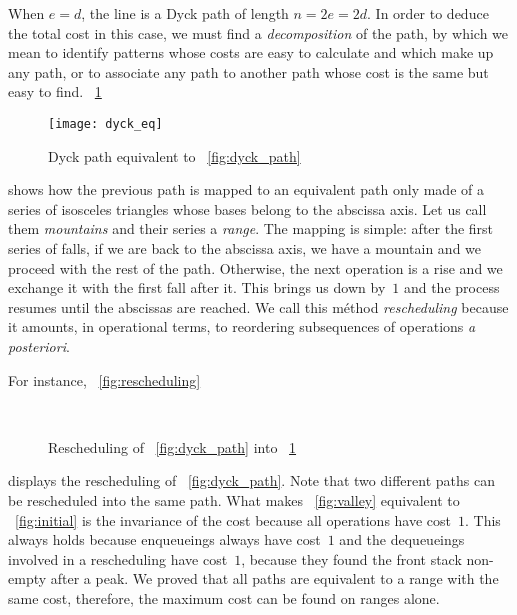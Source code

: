 When \(e=d\), the line is a Dyck path of length \(n=2e=2d\). In order
to deduce the total cost in this case, we must find a
\emph{decomposition} of the path, by
which we mean to identify patterns whose costs are easy to calculate
and which make up any path, or to associate any path to another path
whose cost is the same but easy to find. \Fig~\ref{fig:dyck_eq}
\begin{figure}[!b]
\centering
\texttt{[image: dyck\_eq]}
\caption{Dyck path equivalent to \fig~\ref{fig:dyck_path}}
\label{fig:dyck_eq}
\end{figure}
shows how the previous path is mapped to an equivalent path only made
of a series of isosceles triangles whose bases belong to the abscissa
axis. Let us call them \emph{mountains} and
their series a \emph{range}. The mapping is
simple: after the first series of falls, if we are back to the
abscissa axis, we have a mountain and we proceed with the rest of the
path. Otherwise, the next operation is a rise and we exchange it with
the first fall after it. This brings us down by~\(1\) and the process
resumes until the abscissas are reached. We call this méthod
\emph{rescheduling} because it amounts,
in operational terms, to reordering subsequences of operations \emph{a
posteriori}.

For instance, \fig~\vref{fig:rescheduling}
\begin{figure}
\centering
{}
\qquad
{}\\
\qquad
{}
\caption{Rescheduling of \fig~\ref{fig:dyck_path} into \fig~\ref{fig:dyck_eq}}
\label{fig:rescheduling}
\end{figure}
displays the rescheduling of \fig~\vref{fig:dyck_path}. Note that two
different paths can be rescheduled into the same path. What makes
\fig~\ref{fig:valley} equivalent to \fig~\ref{fig:initial} is the
invariance of the cost because all operations have cost~\(1\). This
always holds because enqueueings always have cost~\(1\) and the
dequeueings involved in a rescheduling have cost~\(1\), because they
found the front stack non\hyp{}empty after a peak. We proved that all
paths are equivalent to a range with the same cost, therefore, the
maximum cost can be found on ranges alone.

